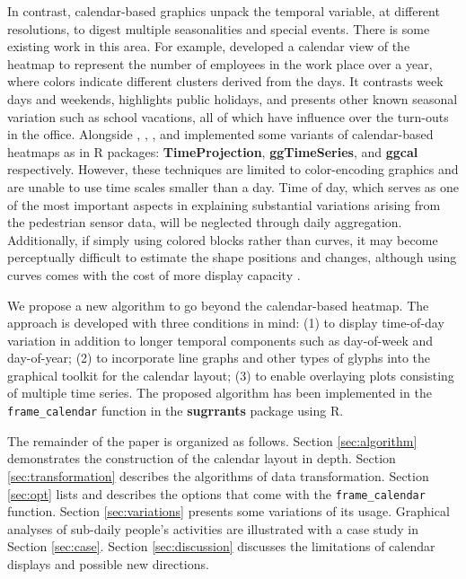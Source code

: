 \documentclass[12pt]{article}
\begin{document}
In contrast, calendar-based graphics unpack the temporal variable, at
different resolutions, to digest multiple seasonalities and special
events. There is some existing work in this area. For example,
\citet{VanWijkCluster1999} developed a calendar view of the heatmap to
represent the number of employees in the work place over a year, where
colors indicate different clusters derived from the days. It contrasts
week days and weekends, highlights public holidays, and presents other
known seasonal variation such as school vacations, all of which have
influence over the turn-outs in the office. Alongside
\citet{Jones-heatmap}, \citet{R-TimeProjection}, \citet{R-ggTimeSeries},
and \citet{R-ggcal} implemented some variants of calendar-based heatmaps
as in R packages: \textbf{TimeProjection}, \textbf{ggTimeSeries}, and
\textbf{ggcal} respectively. However, these techniques are limited to
color-encoding graphics and are unable to use time scales smaller than a
day. Time of day, which serves as one of the most important aspects in
explaining substantial variations arising from the pedestrian sensor
data, will be neglected through daily aggregation. Additionally, if
simply using colored blocks rather than curves, it may become
perceptually difficult to estimate the shape positions and changes,
although using curves comes with the cost of more display capacity
\citep{cleveland1984graphical, lam2007overview}.

We propose a new algorithm to go beyond the calendar-based heatmap. The
approach is developed with three conditions in mind: (1) to display
time-of-day variation in addition to longer temporal components such as
day-of-week and day-of-year; (2) to incorporate line graphs and other
types of glyphs into the graphical toolkit for the calendar layout; (3)
to enable overlaying plots consisting of multiple time series. The
proposed algorithm has been implemented in the \texttt{frame\_calendar}
function in the \textbf{sugrrants} package using R.

The remainder of the paper is organized as follows. Section
\ref{sec:algorithm} demonstrates the construction of the calendar layout
in depth. Section \ref{sec:transformation} describes the algorithms of
data transformation. Section \ref{sec:opt} lists and describes the
options that come with the \texttt{frame\_calendar} function. Section
\ref{sec:variations} presents some variations of its usage. Graphical
analyses of sub-daily people's activities are illustrated with a case
study in Section \ref{sec:case}. Section \ref{sec:discussion} discusses
the limitations of calendar displays and possible new directions.
\end{document}

